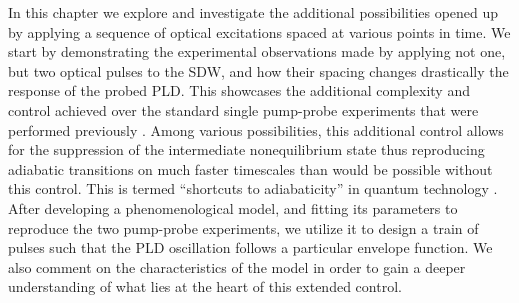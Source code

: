 In this chapter we explore and investigate the additional possibilities opened up by applying a sequence of optical excitations spaced at various points in time.
We start by demonstrating the experimental observations made by applying not one, but two optical pulses to the SDW, and how their spacing changes drastically the response of the probed PLD.
This showcases the additional complexity and control achieved over the standard single pump-probe experiments that were performed previously \cite{Singer2015prb, Singer2015prb}. 
Among various possibilities, this additional control allows for the suppression of the intermediate nonequilibrium state thus reproducing adiabatic transitions on much faster timescales than would be possible without this control.
This is termed ``shortcuts to adiabaticity'' in quantum technology \cite{Torrontegui2013,Deffner2014,Zhou2017}.
After developing a phenomenological model, and fitting its parameters to reproduce the two pump-probe experiments, we utilize it to design a train of pulses such that the PLD oscillation follows a particular envelope function.
We also comment on the characteristics of the model in order to gain a deeper understanding of what lies at the heart of this extended control. 


